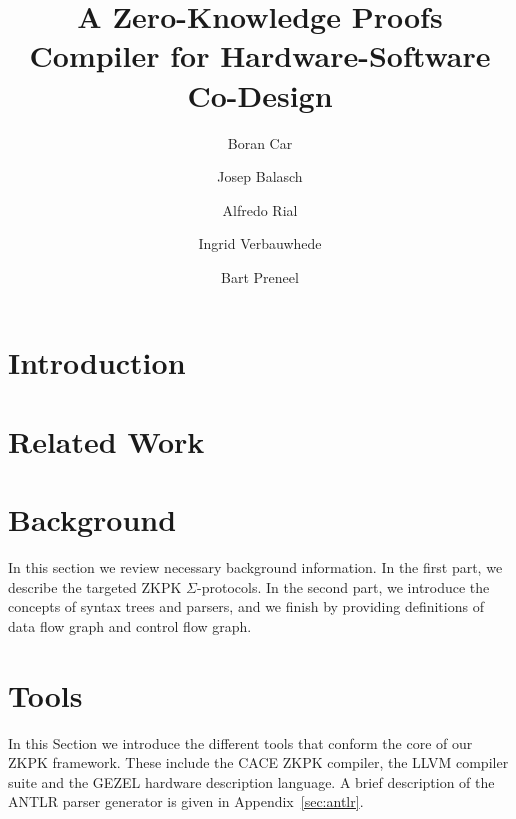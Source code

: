 \documentclass{llncs}
\begin{document}
\title{A Zero-Knowledge Proofs Compiler for Hardware-Software Co-Design}

\author{
Boran Car \and Josep Balasch \and Alfredo Rial \and Ingrid Verbauwhede \and Bart Preneel}

\date{}
\maketitle



\section{Introduction}
\label{introduction}



\section{Related Work}
\label{relatedwork}



\section{Background}
In this section we review necessary background information. In the first part, we describe the targeted ZKPK $\Sigma$-protocols. In the second part, we introduce the concepts of syntax trees and parsers, and we finish by providing
definitions of data flow graph and control flow graph.
\label{preliminaries}




\section{Tools}
\label{sec:tools}
In this Section we introduce the different tools that conform the core
of our ZKPK framework. These include the CACE ZKPK compiler, the LLVM
compiler suite and the GEZEL hardware description language. A brief description
of the ANTLR parser generator is given in Appendix~\ref{sec:antlr}.


\end{document}

